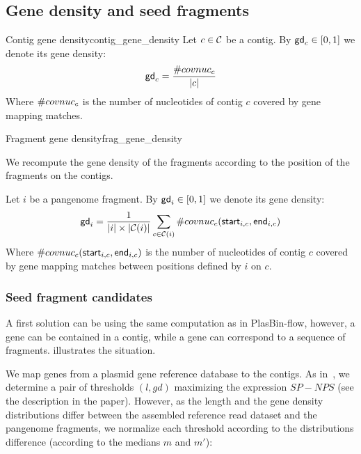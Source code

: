 \subsection{Gene density and seed fragments}

\begin{definition}{Contig gene density}{contig_gene_density}
  Let \(c \in \mathcal{C}{}\) be a contig.
  By \(\mathsf{gd}_{c} \in [0, 1]\) we denote its gene density:
  \[
    \mathsf{gd}_{c} = \frac{ \#covnuc_{c} }{ |c| }
  \]
  Where \(\#covnuc_{c}\) is the number of nucleotides of contig \(c\) covered by gene mapping matches.
\end{definition}

\begin{definition}{Fragment gene density}{frag_gene_density}
  \begin{newfeatbox}
    We recompute the gene density of the fragments according to the position of the fragments on the contigs.
  \end{newfeatbox}

  Let \(i\) be a pangenome fragment.
  By \(\mathsf{gd}_{i} \in [0, 1]\) we denote its gene density:
  \[
    \mathsf{gd}_{i} = \frac{1}{ |i| \times |\mathcal{C}{}(i)| } \sum_{\substack{
        c \in \mathcal{C}{}(i) \\
    }} \#covnuc_{c}(\mathsf{start}_{i, c}, \mathsf{end}_{i, c})
  \]
  Where \(\#covnuc_{c}(\mathsf{start}_{i, c}, \mathsf{end}_{i, c})\) is the number of nucleotides of contig \(c\) covered by gene mapping matches between positions defined by \(i\) on \(c\).
\end{definition}

\subsubsection{Seed fragment candidates}

\begin{notebox}
  A first solution can be using the same computation as in PlasBin-flow, however, a gene can be contained in a contig, while a gene can correspond to a sequence of fragments.
   illustrates the situation.
\end{notebox}

We map genes from a plasmid gene reference database to the contigs.
As in~\cite{manePlasBinflowFlowbasedMILP2023}, we determine a pair of thresholds \((l, gd)\) maximizing the expression \(SP - NPS\) (see the description in the paper).
However, as the length and the gene density distributions differ between the assembled reference read dataset and the pangenome fragments, we normalize each threshold according to the distributions difference (according to the medians \(m\) and \(m'\)):

